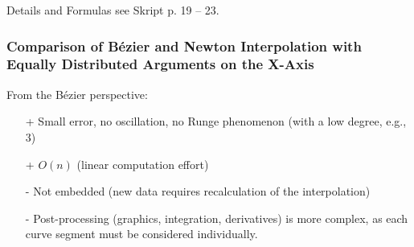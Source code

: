Details and Formulas see Skript p. 19 -- 23.

\subsubsection{Comparison of Bézier and Newton Interpolation with Equally Distributed Arguments on the X-Axis}
  From the Bézier perspective:
  \begin{itemize}
    \item[+] Small error, no oscillation, no Runge phenomenon (with a low degree, e.g., 3)
    \item[+] $O(n)$ (linear computation effort)
    \item[-] Not embedded (new data requires recalculation of the interpolation)
    \item[-] Post-processing (graphics, integration, derivatives) is more complex, as each curve segment must be considered individually.
  \end{itemize}
